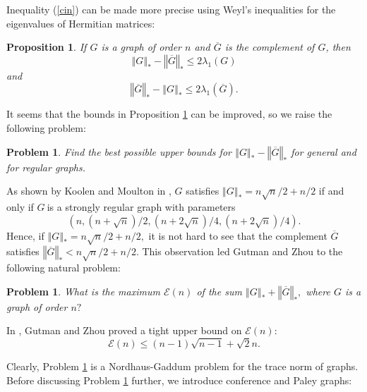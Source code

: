 \documentclass[12pt]{article}%
\newtheorem{problem}[theorem]{Problem}
\newtheorem{proposition}[theorem]{Proposition}
\begin{document}
Inequality (\ref{cin}) can be made more precise using Weyl's inequalities for
the eigenvalues of Hermitian matrices:

\begin{proposition}
\label{pro6}If $G$ is a graph of order $n$ and $\overline{G}$ is the
complement of $G$, then
\[
\left\Vert G\right\Vert _{\ast}-\left\Vert \overline{G}\right\Vert _{\ast}%
\leq2\lambda_{1}(G)
\]
and
\[
\left\Vert \overline{G}\right\Vert _{\ast}-\left\Vert G\right\Vert _{\ast}%
\leq2\lambda_{1}(\overline{G}).
\]

\end{proposition}

It seems that the bounds in Proposition \ref{pro6} can be improved, so we
raise the following problem:

\begin{problem}
Find the best possible upper bounds for $\left\Vert G\right\Vert _{\ast
}-\left\Vert \overline{G}\right\Vert _{\ast}$ for general and for regular graphs.
\end{problem}

As shown by Koolen and Moulton in \cite{KoMo01}, $G$ satisfies $\left\Vert
G\right\Vert _{\ast}=n\sqrt{n}/2+n/2$ if and only if $G\ $is a strongly
regular graph with parameters%
\begin{equation}
\left(  n,\left(  n+\sqrt{n}\right)  /2,\left(  n+2\sqrt{n}\right)  /4,\left(
n+2\sqrt{n}\right)  /4\right)  . \label{Gpar}%
\end{equation}
Hence, if $\left\Vert G\right\Vert _{\ast}=n\sqrt{n}/2+n/2,$ it is not hard to
see that the complement $\overline{G}$ satisfies $\left\Vert \overline
{G}\right\Vert _{\ast}<n\sqrt{n}/2+n/2$. This observation led Gutman and Zhou
\cite{ZhGu07} to the following natural problem:

\begin{problem}
\label{GZ}What is the maximum $\mathcal{E}\left(  n\right)  $ of the sum
$\left\Vert G\right\Vert _{\ast}+\left\Vert \overline{G}\right\Vert _{\ast},$
where $G$ is a graph of order $n?$
\end{problem}

In \cite{ZhGu07}, Gutman and Zhou proved a tight upper bound on $\mathcal{E}%
\left(  n\right)  :$
\begin{equation}
\mathcal{E}\left(  n\right)  \leq\left(  n-1\right)  \sqrt{n-1}+\sqrt{2}n.
\label{GZ1}%
\end{equation}


Clearly, Problem \ref{GZ} is a Nordhaus-Gaddum problem for the trace norm of
graphs. Before discussing Problem \ref{GZ} further, we introduce conference
and Paley graphs:
\end{document}
